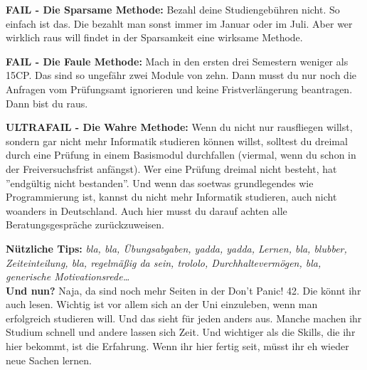 \textbf{FAIL - Die Sparsame Methode:}
Bezahl deine Studiengeb\"uhren nicht. So einfach ist das. Die bezahlt man sonst immer im Januar oder im Juli. Aber wer wirklich raus will findet in der Sparsamkeit eine wirksame Methode.

\textbf{FAIL - Die Faule Methode:}
Mach in den ersten drei Semestern weniger als 15CP. Das sind so ungef\"ahr zwei Module von zehn. Dann musst du nur noch die Anfragen vom Pr\"ufungsamt ignorieren und keine Fristverl\"angerung beantragen. Dann bist du raus.

\textbf{ULTRAFAIL - Die Wahre Methode:}
Wenn du nicht nur rausfliegen willst, sondern gar nicht mehr Informatik
studieren k\"onnen willst, solltest du dreimal durch eine Pr\"ufung in einem
Basismodul durchfallen (viermal, wenn du schon in der Freiversuchsfrist
anf\"angst). Wer eine Pr\"ufung dreimal nicht besteht, hat ''endg\"ultig nicht
bestanden''. Und wenn das soetwas grundlegendes wie Programmierung ist, kannst
du nicht mehr Informatik studieren, auch nicht woanders in Deutschland. Auch
hier musst du darauf achten alle Beratungsgespr\"ache zur\"uckzuweisen.

\textbf{N\"utzliche Tips:}
\emph{bla, bla, \"Ubungsabgaben, yadda, yadda, Lernen, bla, blubber, Zeiteinteilung, bla, regelm\"a{\ss}ig da sein, trololo, Durchhalteverm\"ogen, bla, generische Motivationsrede\dots}\\

\textbf{Und nun?}
Naja, da sind noch mehr Seiten in der Don't Panic! 42. Die k\"onnt ihr auch
lesen. Wichtig ist vor allem sich an der Uni einzuleben, wenn man erfolgreich
studieren will. Und das sieht f\"ur jeden anders aus. Manche machen ihr Studium
schnell und andere lassen sich Zeit. Und wichtiger als die Skills, die ihr hier
bekommt, ist die Erfahrung. Wenn ihr hier fertig seit, m\"usst ihr eh wieder
neue Sachen lernen.





